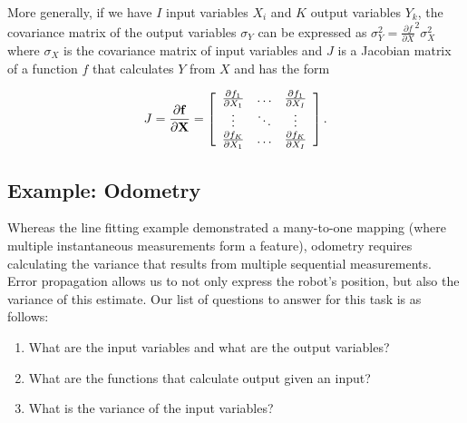 
More generally, if we have $ I$ input variables $ X_i$ and $K$ output variables $Y_k$, the covariance matrix of the output variables $ \sigma_Y$ can be expressed as $\sigma_Y^2=\frac{\partial f}{\partial X}^2 \sigma_X^2$ where $\sigma_X$ is the covariance matrix of input variables and $J$ is a Jacobian matrix of a function $ f$ that calculates $Y$ from $X$ and has the form

\begin{equation}
J=
\frac{\partial \bf{f}}{\partial \bf{X}}
=\left[
\begin{array}{ccc}
  \frac{\partial f_1}{\partial X_1} & \ldots & \frac{\partial f_1}{\partial X_I}\\
  \vdots & \ddots & \vdots\\
  \frac{\partial f_K}{\partial X_1} & \ldots & \frac{\partial f_K}{\partial X_I}
 \end{array}
 \right] .
\end{equation}


\subsection{Example: Odometry}
Whereas the line fitting example demonstrated a many-to-one mapping (where multiple instantaneous measurements form a feature), odometry requires calculating the variance that results from multiple sequential measurements.  Error propagation allows us to not only express the robot's position, but also the variance of this estimate. Our list of questions to answer for this task is as follows:
\begin{enumerate}
\item What are the input variables and what are the output variables?
\item What are the functions that calculate output given an input?
\item What is the variance of the input variables?
\end{enumerate}

